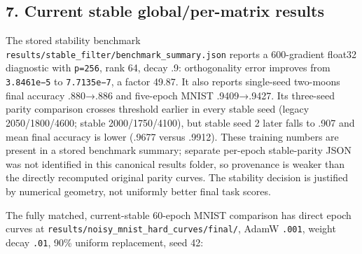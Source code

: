 \documentclass[
  british,
  10pt,
  a4paper,
]{article}
\begin{document}
\subsection{\texorpdfstring{7. Current stable
global/\allowbreak{}per-\allowbreak{}matrix
results}{7. Current stable  results}}\label{classical-evidence--current-stable-globalper-matrix-results}

The stored stability benchmark
\texttt{results/\allowbreak{}stable\_\allowbreak{}filter/\allowbreak{}benchmark\_\allowbreak{}summary.\allowbreak{}json}
reports a 600-\allowbreak{}gradient float32 diagnostic with
\texttt{p=256}, rank 64, decay .9: orthogonality error improves from
\texttt{3.8461e−5} to \texttt{7.7135e−7}, a factor 49.87. It also
reports single-\allowbreak{}seed two-moons final accuracy .880→.886 and
five-epoch MNIST .\allowbreak{}9409→.\allowbreak{}9427.\allowbreak{} Its
three-seed parity comparison crosses threshold earlier in every stable
seed (legacy 2050/\allowbreak{}1800/\allowbreak{}4600; stable
2000/\allowbreak{}1750/\allowbreak{}4100),\allowbreak{} but stable seed
2 later falls to .907 and mean final accuracy is lower (.9677 versus
.9912). These training numbers are present in a stored benchmark
summary; separate per-epoch stable-\allowbreak{}parity JSON was not
identified in this canonical results folder, so provenance is weaker
than the directly recomputed original parity curves. The stability
decision is justified by numerical geometry, not uniformly better final
task scores.

The fully matched, current-\allowbreak{}stable 60-epoch MNIST comparison
has direct epoch curves at
\texttt{results/\allowbreak{}noisy\_\allowbreak{}mnist\_\allowbreak{}hard\_\allowbreak{}curves/\allowbreak{}final/\allowbreak{}},
AdamW \texttt{.001}, weight decay \texttt{.01}, 90\% uniform
replacement,\allowbreak{} seed 42:
\end{document}
